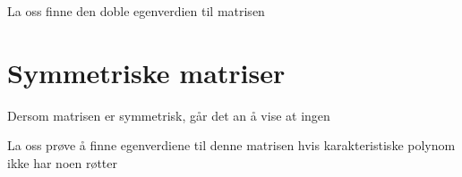 \begin{ex}
La oss finne den doble egenverdien til matrisen
\end{ex}



\section*{Symmetriske matriser}
Dersom matrisen er symmetrisk, går det an å vise at ingen 
\begin{ex}
La oss prøve å finne egenverdiene til denne matrisen hvis karakteristiske polynom ikke har noen røtter
\end{ex}


\kapittelslutt
